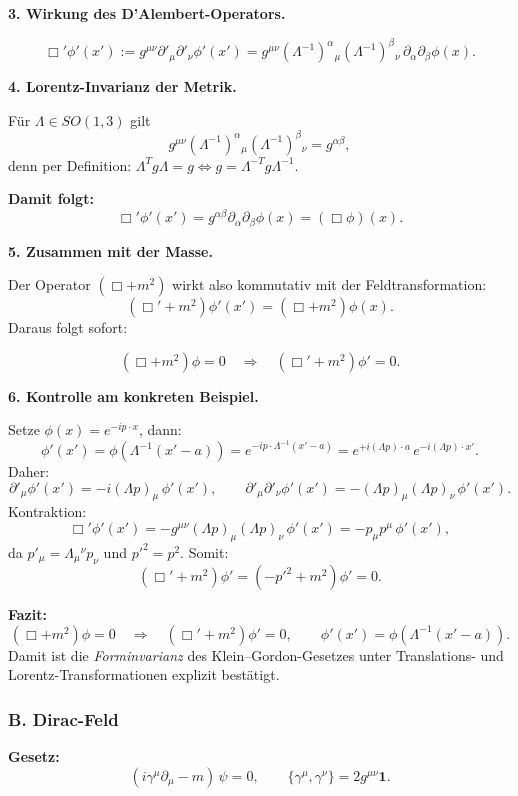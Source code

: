 \documentclass[10pt, letterpaper]{article}
\begin{document}
\textbf{3. Wirkung des D’Alembert-Operators.}

\[
\Box' \phi'(x') 
:= g^{\mu\nu} \partial'_\mu \partial'_\nu \phi'(x')
= g^{\mu\nu} (\Lambda^{-1})^\alpha{}_\mu (\Lambda^{-1})^\beta{}_\nu \,
\partial_\alpha \partial_\beta \phi(x).
\]

\textbf{4. Lorentz-Invarianz der Metrik.}

Für $\Lambda\in SO(1,3)$ gilt
\[
g^{\mu\nu} (\Lambda^{-1})^\alpha{}_\mu (\Lambda^{-1})^\beta{}_\nu
= g^{\alpha\beta},
\]
denn per Definition: \(\Lambda^T g \Lambda = g \iff g = \Lambda^{-T} g \Lambda^{-1}\).

\textbf{Damit folgt:}
\[
\Box'\phi'(x') = g^{\alpha\beta} \partial_\alpha \partial_\beta \phi(x)
= (\Box \phi)(x).
\]

\textbf{5. Zusammen mit der Masse.}

Der Operator $(\Box + m^2)$ wirkt also kommutativ mit der Feldtransformation:
\[
(\Box' + m^2)\phi'(x') 
= (\Box + m^2)\phi(x).
\]
Daraus folgt sofort:

\[
(\Box + m^2)\phi = 0
\quad\Longrightarrow\quad
(\Box' + m^2)\phi' = 0.
\]

\textbf{6. Kontrolle am konkreten Beispiel.}

Setze $\phi(x)=e^{-ip\cdot x}$, dann:
\[
\phi'(x')=\phi(\Lambda^{-1}(x'-a)) = e^{-ip\cdot\Lambda^{-1}(x'-a)}
= e^{+i(\Lambda p)\cdot a}\, e^{-i(\Lambda p)\cdot x'}.
\]
Daher:
\[
\partial'_\mu \phi'(x') = -i (\Lambda p)_\mu\, \phi'(x'),
\qquad
\partial'_\mu \partial'_\nu \phi'(x') 
= -(\Lambda p)_\mu(\Lambda p)_\nu\, \phi'(x').
\]
Kontraktion:
\[
\Box'\phi'(x') = - g^{\mu\nu}(\Lambda p)_\mu(\Lambda p)_\nu\, \phi'(x')
= -p_\mu p^\mu\, \phi'(x'),
\]
da \(p'_\mu = \Lambda_\mu{}^\nu p_\nu\) und \(p'^2=p^2\).
Somit:
\[
(\Box'+m^2)\phi' = (-p'^2+m^2)\phi' = 0.
\]

\bigskip
\textbf{Fazit:}
\[
\boxed{
(\Box + m^2)\phi = 0
\quad\Longrightarrow\quad
(\Box' + m^2)\phi' = 0,
\qquad
\phi'(x')=\phi(\Lambda^{-1}(x'-a)).
}
\]
Damit ist die \emph{Forminvarianz} des Klein–Gordon-Gesetzes unter 
Translations- und Lorentz-Transformationen explizit bestätigt.


\bigskip
\subsubsection*{B. Dirac-Feld}

\textbf{Gesetz:}
\[
(i\gamma^\mu\partial_\mu - m)\,\psi = 0,
\qquad
\{\gamma^\mu,\gamma^\nu\} = 2g^{\mu\nu}\mathbf 1.
\]
\end{document}
